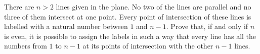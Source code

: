There are $n>2$ lines given in the plane. No two of the lines are parallel and no three of them intersect at one point. Every point of intersection of these lines is labelled with a natural number between $1$ and $n-1$. Prove that, if and only if $n$ is even, it is possible to assign the labels in such a way that every line has all the numbers from $1$ to $n-1$ at its points of intersection with the other $n-1$ lines.